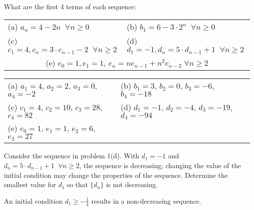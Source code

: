 \documentclass[11pt,addpoints]{exam}
\begin{document}
\begin{questions}
\printanswers

\question[10] What are the first 4 terms of each sequence:

\begin{tabular}{ll}
    (a) $a_n = 4-2n\;\;\forall n \geq 0$ \hspace{0.35in} 
    	& (b) $b_1 = 6- 3\cdot 2^n \;\;\forall n \geq 0$ \\
    (c) $c_1 = 4,  c_n = 3\cdot c_{n-1} - 2 \;\; \forall n \geq 2$ \hspace{0.3in}
    	& (d) $d_1 = -1, d_n = 5\cdot d_{n-1} + 1\;\; \forall n \geq 2$ \\
    \multicolumn{2}{c}{(e) $e_0 = 1, e_1 = 1$, $e_n = ne_{n-1} + n^2e_{n-2} \;\forall n \geq 2$}
\end{tabular}
    \ifprintanswers
        \vspace{-10pt}
   \fi
\begin{solution}

	\begin{tabular}{ll}
		(a) $a_1 = 4$, $a_2 = 2$, $a_3 = 0$, $a_4 = -2$ \hspace{0.2in}
			& (b) $b_1 = 3$, $b_2 = 0$, $b_3 = -6$, $b_4 = -18$ \\
		(c) $c_1 = 4$, $c_2 = 10$, $c_3 = 28$, $c_4 = 82$
			& (d) $d_1 = -1$, $d_2 = -4$, $d_3 = -19$, $d_4 = -94$ \\
		(e) $e_0 = 1$, $e_1 = 1$, $e_2 = 6$, $e_3 = 27$
	\end{tabular}
\end{solution}


\bonusquestion[3] Consider the sequence in problem 1(d).  With $d_1 = -1$ and $d_n = 5\cdot d_{n-1} + 1 \;\;\forall n \geq 2$, the sequence is decreasing; changing the value of the initial condition may change the properties of the sequence.  Determine the smallest value for $d_1$ so that $\{d_n\}$ is not decreasing.
\ifprintanswers
        \vspace{-10pt}
   \fi
\begin{solution}
 An initial condition $d_1 \geq -\frac{1}{4}$ results in a non-decreasing sequence.
\end{solution}



\end{questions}
\end{document}
